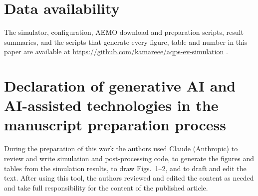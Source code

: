 \documentclass[preprint,12pt]{elsarticle}
\begin{document}
\section*{Data availability}
The simulator, configuration, AEMO download and preparation scripts, result summaries, and the scripts that
generate every figure, table and number in this paper are available at
\url{https://github.com/kamareee/aqps-ev-simulation} \cite{uddin2026aqps}.

\section*{Declaration of generative AI and AI-assisted technologies in the manuscript preparation process}
During the preparation of this work the authors used Claude (Anthropic) to review and write simulation and
post-processing code, to generate the figures and tables from the simulation results, to draw Figs.~1--2,
and to draft and edit the text. After using this tool, the authors reviewed and edited the content as needed
and take full responsibility for the content of the published article.



\end{document}
